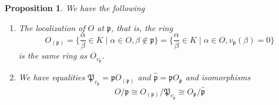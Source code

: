 \documentclass{article}
\newtheorem{proposition}{Proposition}[section]
\newcommand{\mfrak}[1]{\mathfrak{#1}}
\newcommand{\vp}{{v_{\mfrak p}}}
\numberwithin{equation}{section}
\begin{document}
\begin{proposition} \label{prop: Valuations on Dedekin domains properties}
    We have the following 
    \begin{enumerate}
        \item The localization of $O$ at $\mfrak p$, that is, the ring
              $$O_{(\mfrak p)} = \{\frac{\alpha}{\beta} \in K \mid \alpha \in O, \beta \notin \mfrak p\} =  \{\frac{\alpha}{\beta} \in K \mid \alpha \in O, \vp(\beta) = 0 \}$$
              is the same ring as $O_{\vp}$.
        \item We have equalities $\mfrak P_\vp = \mfrak p O_{(\mfrak p)}$ and $\hat {\mfrak p } = \mfrak p O_{\mfrak p}$ and isomorphisms
              $$
                  O / \mfrak{p} \cong O_{(\mfrak{p})} / \mfrak{P}_{v_{\mfrak{p}}} \cong O_{\mfrak{p}} / \hat{\mfrak{p}}
              $$

    \end{enumerate}

\end{proposition}
\end{document}
